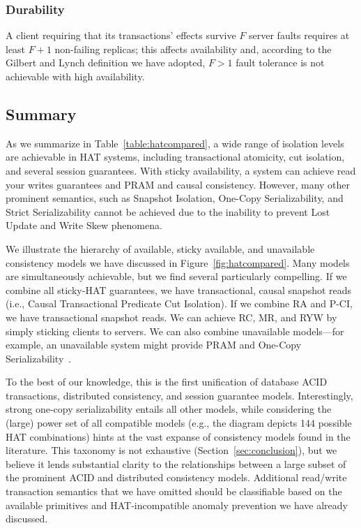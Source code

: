 \subsubsection{Durability}

A client requiring that its transactions' effects survive $F$ server
faults requires at least $F+1$ non-failing replicas; this affects
availability and, according to the Gilbert and Lynch definition we
have adopted, $F>1$ fault tolerance is not achievable with high
availability.


\subsection{Summary}
\label{sec:hat-summary}

As we summarize in Table~\ref{table:hatcompared}, a wide range of
isolation levels are achievable in HAT systems, including
transactional atomicity, cut isolation, and several session
guarantees. With sticky availability, a system can achieve read your
writes guarantees and PRAM and causal consistency. However, many other
prominent semantics, such as Snapshot Isolation, One-Copy
Serializability, and Strict Serializability cannot be achieved due to
the inability to prevent Lost Update and Write Skew phenomena.

We illustrate the hierarchy of available, sticky available, and
unavailable consistency models we have discussed in
Figure~\ref{fig:hatcompared}. Many models are simultaneously
achievable, but we find several particularly compelling. If we combine
all sticky-HAT guarantees, we have transactional, causal snapshot
reads (i.e., Causal Transactional Predicate Cut Isolation). If we
combine RA and P-CI, we have transactional snapshot reads. We can
achieve RC, MR, and RYW by simply sticking clients to servers. We can
also combine unavailable models---for example, an unavailable system
might provide PRAM and One-Copy
Serializability~\cite{daudjee-session}.

To the best of our knowledge, this is the first unification of
database ACID transactions, distributed consistency, and session
guarantee models. Interestingly, strong one-copy serializability
entails all other models, while considering the (large) power set of
all compatible models (e.g., the diagram depicts 144 possible HAT
combinations) hints at the vast expanse of consistency models found in
the literature. This taxonomy is not exhaustive
(Section~\ref{sec:conclusion}), but we believe it lends substantial
clarity to the relationships between a large subset of the prominent
ACID and distributed consistency models. Additional read/write
transaction semantics that we have omitted should be classifiable
based on the available primitives and HAT-incompatible anomaly
prevention we have already discussed.

